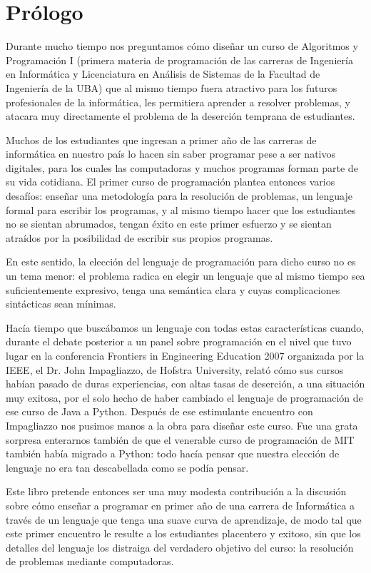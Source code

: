 \chapter*{Prólogo}

Durante mucho tiempo nos preguntamos cómo diseñar un curso de Algoritmos y Programación I
(primera materia de programación de las carreras de Ingeniería en Informática y Licenciatura
en Análisis de Sistemas de la Facultad de Ingeniería de la UBA) que al mismo tiempo fuera
atractivo para los futuros profesionales de la informática, les permitiera aprender a resolver
problemas, y atacara muy directamente el problema de la deserción temprana de estudiantes.


Muchos de los estudiantes que ingresan a primer año de las carreras de informática en nuestro
país lo hacen sin saber programar pese a ser nativos digitales, para los cuales las computadoras
y muchos programas forman parte de su vida cotidiana. El primer curso de programación plantea
entonces varios desafíos: enseñar una metodología para la resolución de problemas, un lenguaje
formal para escribir los programas, y al mismo tiempo hacer que los estudiantes no se sientan
abrumados, tengan éxito en este primer esfuerzo y se sientan atraídos por la posibilidad de
escribir sus propios programas.


En este sentido, la elección del lenguaje de programación para dicho curso no es un tema menor:
el problema radica en elegir un lenguaje que al mismo tiempo sea suficientemente expresivo, tenga
una semántica clara y cuyas complicaciones sintácticas sean mínimas.


Hacía tiempo que buscábamos un lenguaje con todas estas características cuando, durante el debate
posterior a un panel sobre programación en el nivel que tuvo lugar en la conferencia Frontiers in
Engineering Education 2007 organizada por la IEEE, el Dr. John Impagliazzo, de Hofstra University,
relató cómo sus cursos habían pasado de duras experiencias, con altas tasas de deserción, a una
situación muy exitosa, por el solo hecho de haber cambiado el lenguaje de programación de ese curso
de Java a Python. Después de ese estimulante encuentro con Impagliazzo nos pusimos manos a la obra
para diseñar este curso. Fue una grata sorpresa enterarnos también de que el venerable curso de
programación de MIT también había migrado a Python: todo hacía pensar que nuestra elección de lenguaje
no era tan descabellada como se podía pensar.


Este libro pretende entonces ser una muy modesta contribución a la discusión sobre cómo enseñar a
programar en primer año de una carrera de Informática a través de un lenguaje que tenga una suave
curva de aprendizaje, de modo tal que este primer encuentro le resulte a los estudiantes placentero
y exitoso, sin que los detalles del lenguaje los distraiga del verdadero objetivo del curso: la resolución
de problemas mediante computadoras.


